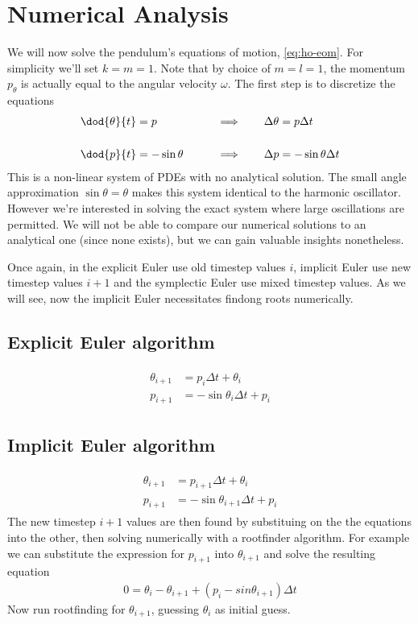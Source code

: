 \section{Numerical Analysis}
We will now solve the pendulum's equations of motion, \eqref{eq:ho-eom}. For simplicity we'll set $k = m = 1$. Note that by choice of $m=l=1$, the momentum $p_\theta$ is actually equal to the angular velocity $\omega$. The first step is to discretize the equations
\begin{alignat}{2}
&\dod{\theta}{t} = p  & \qquad \implies \qquad &\Delta \theta = p \Delta t \\[0.5cm]
&\dod{p}{t} = -\sin{\theta} & \qquad \implies \qquad &\Delta p = - \sin{\theta} \Delta t
\end{alignat}
This is a non-linear system of PDEs with no analytical solution. The small angle approximation $\sin{\theta} = \theta$ makes this system identical to the harmonic oscillator. However we're interested in solving the exact system where large oscillations are permitted. We will not be able to compare our numerical solutions to an analytical one (since none exists), but we can gain valuable insights nonetheless.

Once again, in the explicit Euler use old timestep values $i$, implicit Euler use new timestep values $i+1$ and the symplectic Euler use mixed timestep values. As we will see, now the implicit Euler necessitates findong roots numerically.
\subsection{Explicit Euler algorithm}
\begin{align}
\begin{split}
\label{al:pe-euler_e}
\theta_{i+1} &= p_i \Delta t + \theta_i \\
p_{i+1} &= - \sin{\theta_i} \Delta t + p_i
\end{split}
\end{align}

\subsection{Implicit Euler algorithm}
\begin{align}
\begin{split}
\label{al:pe-euler_i}
\theta_{i+1} &= p_{i+1} \Delta t + \theta_i \\
p_{i+1} &= - \sin{\theta_{i+1}} \Delta t + p_i
\end{split}
\end{align}
The new timestep $i+1$ values are then found by substituing on the the equations into the other, then solving numerically with a rootfinder algorithm. For example we can substitute the expression for $p_{i+1}$ into $\theta_{i+1}$ and solve the resulting equation
\begin{align}
0 = \theta_i - \theta_{i+1} + (p_i - sin{\theta_{i+1}})\Delta t
\end{align}
Now run rootfinding for $\theta_{i+1}$, guessing $\theta_i$ as initial guess.

